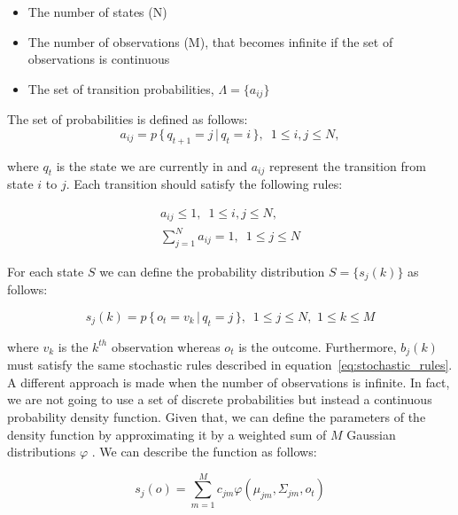 \begin{itemize}
	\item The number of states (N)
	\item The number of observations (M), that becomes infinite if the set of observations is continuous
	\item The set of transition probabilities, $\Lambda = \{ a_{ij}\}$
\end{itemize}

The set of probabilities is defined as follows:
\begin{equation}
\label{eq:transition_probabilities}
a_{ij} = p \, \{ \, q_{t+1} = j \, | \, q_{t} = i \, \}, \, \, \, 1 \leq i,j \leq N,
\end{equation}

\noindent where $q_{t}$ is the state we are currently in and $a_{ij}$ represent the transition from state $i$ to $j$.
Each transition should satisfy the following rules:

\begin{subequations}
	\label{eq:stochastic_rules}
	\begin{align}
	a_{ij} \le 1, \, \, \, 1 \leq i,j \leq N, \\ %
	\sum_{j=1}^{N} a_{ij} = 1, \, \, \, 1 \leq j \leq N
	\end{align}
\end{subequations}

\noindent For each state $S$ we can define the probability distribution $S = \{s_{j}(k)\}$ as follows:

\begin{equation}
s_{j}(k) = p \, \{\, o_{t} = v_{k} \, | \, q_{t} = j \, \}, \, \, \, 1 \leq j \leq N, \,\, 1 \leq k \leq M
\end{equation}

\noindent where $v_k$ is the $k^{th}$ observation whereas $o_{t}$ is the outcome. Furthermore, $b_{j}(k)$ must satisfy the same stochastic rules described in equation~\ref{eq:stochastic_rules}. \\

\noindent A different approach is made when the number of observations is infinite. In fact, we are not going to use a set of discrete probabilities but instead a continuous probability density function. Given that, we can define the parameters of the density function by approximating it by a weighted sum of $M$ Gaussian distributions $\varphi$ \cite{def_hmm}. We can describe the function as follows:

\begin{equation}
	s_{j}(o) = \sum_{m = 1}^{M} c_{jm}\varphi (\mu_{jm}, \Sigma_{jm}, o_{t})
\end{equation}

